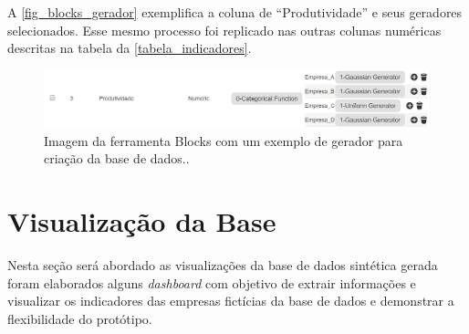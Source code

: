 \documentclass[
	12pt,				%
	openright,			%
	oneside,			%
	a4paper,			%
	english,			%
	brazil				%
	]{abntex2}
\begin{document}
A \autoref{fig_blocks_gerador} exemplifica a coluna de “Produtividade” e seus geradores selecionados. Esse mesmo processo foi replicado nas outras colunas numéricas descritas na tabela da \autoref{tabela_indicadores}.

\begin{figure}[!htb]
	\caption{\label{fig_blocks_gerador} Imagem da ferramenta Blocks com um exemplo de gerador para criação da base de dados..
}
	\begin{center}
	    \includegraphics[width=40pc,scale=1]{figures/geradorBlocks.png}
	\end{center}
\end{figure}

\section{Visualização da Base}
Nesta seção será abordado as visualizações da base de dados sintética gerada foram elaborados alguns \textit{dashboard} com objetivo de extrair informações e visualizar os indicadores das empresas  fictícias da base de dados e demonstrar a flexibilidade do protótipo.
\end{document}
